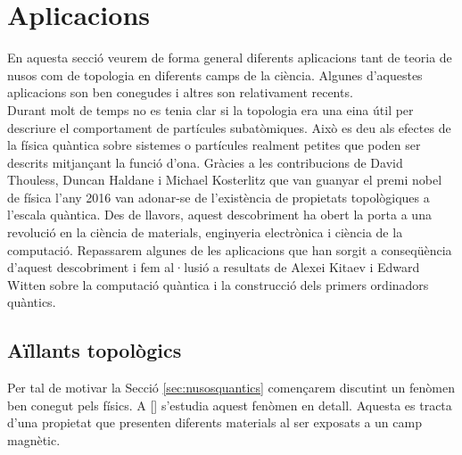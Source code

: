 
\section{Aplicacions}\label{sec:Aplicacions}

En aquesta secció veurem de forma general diferents aplicacions tant de teoria de nusos com de topologia en diferents camps de la ciència. Algunes d'aquestes aplicacions son ben conegudes i altres son relativament recents.\\

Durant molt de temps no es tenia clar si la topologia era una eina útil per descriure el comportament de partícules subatòmiques. Això es deu als efectes de la física quàntica sobre sistemes o partícules realment petites que poden ser descrits mitjançant la funció d'ona. Gràcies a les contribucions de David Thouless, Duncan Haldane i Michael Kosterlitz que van guanyar el premi nobel de física l'any 2016 van adonar-se de l'existència de propietats topològiques a l'escala quàntica. Des de llavors, aquest descobriment ha obert la porta a una revolució en la ciència de materials, enginyeria electrònica i ciència de la computació. Repassarem algunes de les aplicacions que han sorgit a conseqüència d'aquest descobriment i fem al·lusió a resultats de Alexei Kitaev i Edward Witten sobre la computació quàntica i la construcció dels primers ordinadors quàntics.

\subsection{Aïllants topològics}\label{sec:aillanttopologic}
 Per tal de motivar la Secció \ref{sec:nusosquantics} començarem discutint un fenòmen ben conegut pels físics. A [\cite{topologicalinsulators}] s'estudia aquest fenòmen en detall. Aquesta es tracta d'una propietat que presenten diferents materials al ser exposats a un camp magnètic.\\
 
